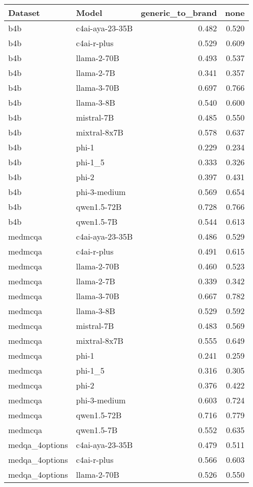 \begin{tabular}{llrr}
\toprule
Dataset & Model & generic_to_brand & none \\
\midrule
b4b & c4ai-aya-23-35B & 0.482 & 0.520 \\
b4b & c4ai-r-plus & 0.529 & 0.609 \\
b4b & llama-2-70B & 0.493 & 0.537 \\
b4b & llama-2-7B & 0.341 & 0.357 \\
b4b & llama-3-70B & 0.697 & 0.766 \\
b4b & llama-3-8B & 0.540 & 0.600 \\
b4b & mistral-7B & 0.485 & 0.550 \\
b4b & mixtral-8x7B & 0.578 & 0.637 \\
b4b & phi-1 & 0.229 & 0.234 \\
b4b & phi-1_5 & 0.333 & 0.326 \\
b4b & phi-2 & 0.397 & 0.431 \\
b4b & phi-3-medium & 0.569 & 0.654 \\
b4b & qwen1.5-72B & 0.728 & 0.766 \\
b4b & qwen1.5-7B & 0.544 & 0.613 \\
medmcqa & c4ai-aya-23-35B & 0.486 & 0.529 \\
medmcqa & c4ai-r-plus & 0.491 & 0.615 \\
medmcqa & llama-2-70B & 0.460 & 0.523 \\
medmcqa & llama-2-7B & 0.339 & 0.342 \\
medmcqa & llama-3-70B & 0.667 & 0.782 \\
medmcqa & llama-3-8B & 0.529 & 0.592 \\
medmcqa & mistral-7B & 0.483 & 0.569 \\
medmcqa & mixtral-8x7B & 0.555 & 0.649 \\
medmcqa & phi-1 & 0.241 & 0.259 \\
medmcqa & phi-1_5 & 0.316 & 0.305 \\
medmcqa & phi-2 & 0.376 & 0.422 \\
medmcqa & phi-3-medium & 0.603 & 0.724 \\
medmcqa & qwen1.5-72B & 0.716 & 0.779 \\
medmcqa & qwen1.5-7B & 0.552 & 0.635 \\
medqa_4options & c4ai-aya-23-35B & 0.479 & 0.511 \\
medqa_4options & c4ai-r-plus & 0.566 & 0.603 \\
medqa_4options & llama-2-70B & 0.526 & 0.550 \\

\end{tabular}
